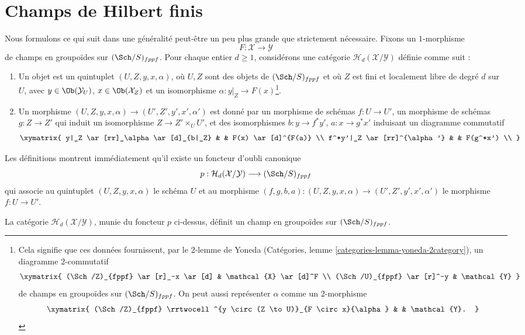 \section{Champs de Hilbert finis}
\label{section-hilbert-d-stack}

\noindent
Nous formulons ce qui suit dans une généralité peut-être un peu plus grande
que strictement nécessaire. Fixons un $1$-morphisme
$$
F : \mathcal{X} \longrightarrow \mathcal{Y}
$$
de champs en groupoïdes sur $(\Sch/S)_{fppf}$. Pour chaque entier
$d \geq 1$, considérons une catégorie $\mathcal{H}_d(\mathcal{X}/\mathcal{Y})$
définie comme suit :
\begin{enumerate}
\item Un objet est un quintuplet $(U, Z, y, x, \alpha)$, où $U, Z$ sont des objets de
$(\Sch/S)_{fppf}$ et où $Z$ est fini et localement libre de degré
$d$ sur $U$, avec
$y \in \Ob(\mathcal{Y}_U)$, $x \in \Ob(\mathcal{X}_Z)$
et un isomorphisme $\alpha : y|_Z \to F(x)$\footnote{
Cela signifie que ces données fournissent, par le $2$-lemme de Yoneda
(Catégories, lemme \ref{categories-lemma-yoneda-2category}), un
diagramme $2$-commutatif
$$
\xymatrix{
(\Sch/Z)_{fppf} \ar[r]_-x \ar[d] & \mathcal{X} \ar[d]^F \\
(\Sch/U)_{fppf} \ar[r]^-y & \mathcal{Y}
}
$$
de champs en groupoïdes sur $(\Sch/S)_{fppf}$.
On peut aussi représenter $\alpha$ comme un $2$-morphisme
$$
\xymatrix{
(\Sch/Z)_{fppf}
\rrtwocell^{y \circ (Z \to U)}_{F \circ x}{\alpha} & &
\mathcal{Y}.
}
$$
}.
\item Un morphisme $(U, Z, y, x, \alpha) \to (U', Z', y', x', \alpha')$ est
donné par un morphisme de schémas $f : U \to U'$, un morphisme de schémas
$g : Z \to Z'$ qui induit un isomorphisme $Z \to Z' \times_U U'$,
et des isomorphismes $b : y \to f^*y'$, $a : x \to g^*x'$ induisant un diagramme
commutatif
$$
\xymatrix{
y|_Z \ar[rr]_\alpha \ar[d]_{b|_Z} & &
F(x) \ar[d]^{F(a)} \\
f^*y'|_Z \ar[rr]^{\alpha'} & &
F(g^*x') \\
}
$$
\end{enumerate}
Les définitions montrent immédiatement qu'il existe un foncteur d'oubli
canonique
$$
p :
\mathcal{H}_d(\mathcal{X}/\mathcal{Y})
\longrightarrow
(\Sch/S)_{fppf}
$$
qui associe au quintuplet $(U, Z, y, x, \alpha)$ le schéma $U$
et au morphisme
$(f, g, b, a) : (U, Z, y, x, \alpha) \to (U', Z', y', x', \alpha')$
le morphisme $f : U \to U'$.

\begin{lemma}
\label{lemma-hilbert-d-stack}
La catégorie $\mathcal{H}_d(\mathcal{X}/\mathcal{Y})$, munie
du foncteur $p$ ci-dessus, définit un champ en groupoïdes sur
$(\Sch/S)_{fppf}$.
\end{lemma}

